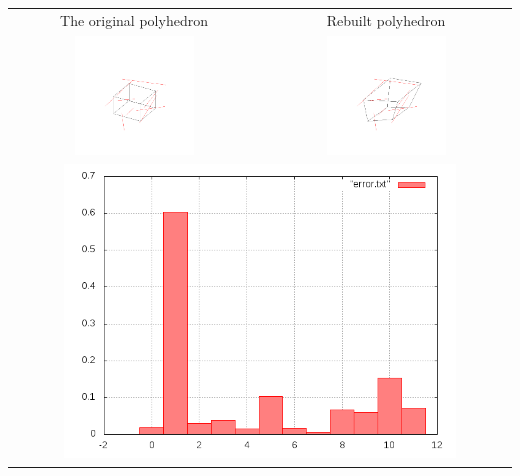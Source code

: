 \documentclass[11pt,fleqn,a4paper]{scrartcl}
\begin{document}
\begin{center}

\begin{tabular}{|c|c|}
\hline
The original polyhedron& Rebuilt polyhedron \\
\includegraphics[width=0.5\textwidth]{variant2/images/15/input.png} &
\includegraphics[width=0.5\textwidth]{variant2/images/15/out.png} \\
\midrule
\multicolumn{2}{|c|}{ \includegraphics[width=0.8\textwidth]{variant2/images/15/error.png}} \\
\hline
\end{tabular}
\end{center}
\newpage
\end{document}
